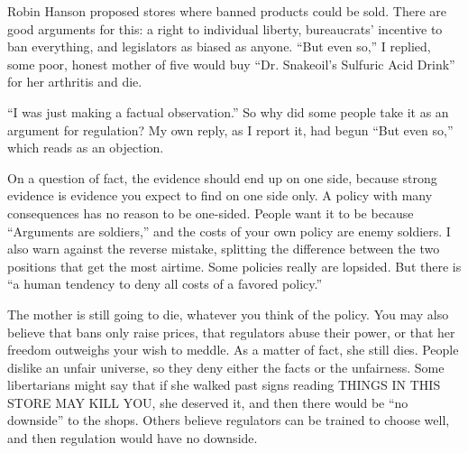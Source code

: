 
Robin Hanson proposed stores where banned products could be sold. There are good arguments for this: a right to individual liberty, bureaucrats' incentive to ban everything, and legislators as biased as anyone. ``But even so,'' I replied, some poor, honest mother of five would buy ``Dr. Snakeoil's Sulfuric Acid Drink'' for her arthritis and die. 

``I was just making a factual observation.'' So why did some people take it as an argument for regulation? My own reply, as I report it, had begun ``But even so,'' which reads as an objection.

On a question of fact, the evidence should end up on one side, because strong evidence is evidence you expect to find on one side only. A policy with many consequences has no reason to be one-sided. People want it to be because ``Arguments are soldiers,'' and the costs of your own policy are enemy soldiers.  I also warn against the reverse mistake, splitting the difference between the two positions that get the most airtime. Some policies really are lopsided. But there is ``a human tendency to deny all costs of a favored policy.'' 

The mother is still going to die, whatever you think of the policy. You may also believe that bans only raise prices, that regulators abuse their power, or that her freedom outweighs your wish to meddle. As a matter of fact, she still dies. People dislike an unfair universe, so they deny either the facts or the unfairness. Some libertarians might say that if she walked past signs reading THINGS IN THIS STORE MAY KILL YOU, she deserved it, and then there would be ``no downside'' to the shops.  Others believe regulators can be trained to choose well, and then regulation would have no downside.

